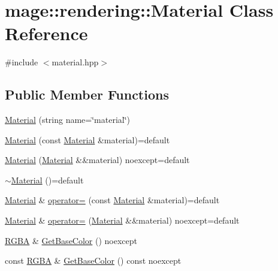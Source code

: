 \hypertarget{classmage_1_1rendering_1_1_material}{}\section{mage\+:\+:rendering\+:\+:Material Class Reference}
\label{classmage_1_1rendering_1_1_material}


{\ttfamily \#include $<$material.\+hpp$>$}

\subsection*{Public Member Functions}
\begin{DoxyCompactItemize}
\item 
\hyperlink{classmage_1_1rendering_1_1_material_a0d23055b62f54a28c77010412099a446}{Material} (string name=\char`\"{}material\char`\"{})
\item 
\hyperlink{classmage_1_1rendering_1_1_material_ac7cffca59fe250f10c2e68a875a03e91}{Material} (const \hyperlink{classmage_1_1rendering_1_1_material}{Material} \&material)=default
\item 
\hyperlink{classmage_1_1rendering_1_1_material_a52f4b3b0849b96306ea79c746070c6ba}{Material} (\hyperlink{classmage_1_1rendering_1_1_material}{Material} \&\&material) noexcept=default
\item 
\hyperlink{classmage_1_1rendering_1_1_material_a0dcdba799e013b2a8ff0108b14b9a73c}{$\sim$\+Material} ()=default
\item 
\hyperlink{classmage_1_1rendering_1_1_material}{Material} \& \hyperlink{classmage_1_1rendering_1_1_material_a535022bb3c1264412278337fc3d5d717}{operator=} (const \hyperlink{classmage_1_1rendering_1_1_material}{Material} \&material)=default
\item 
\hyperlink{classmage_1_1rendering_1_1_material}{Material} \& \hyperlink{classmage_1_1rendering_1_1_material_a2f90e0eeb8283da70db48fc1618aed10}{operator=} (\hyperlink{classmage_1_1rendering_1_1_material}{Material} \&\&material) noexcept=default
\item 
\hyperlink{structmage_1_1_r_g_b_a}{R\+G\+BA} \& \hyperlink{classmage_1_1rendering_1_1_material_a9dd92f97dbae7cfbdae55759c20f6887}{Get\+Base\+Color} () noexcept
\item 
const \hyperlink{structmage_1_1_r_g_b_a}{R\+G\+BA} \& \hyperlink{classmage_1_1rendering_1_1_material_aa98da3297c5043b9107638c877382bd8}{Get\+Base\+Color} () const noexcept
\item 

\end{DoxyCompactItemize}

